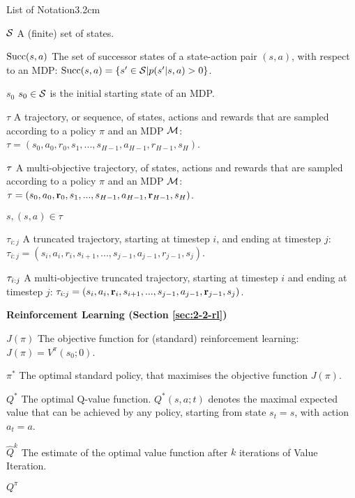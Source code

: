\begin{mclistof}{List of Notation}{3.2cm}
    \item[$\mathcal{S}$]
        A (finite) set of states.
    \item[${\textnormal{Succ}(s,a)}$]
        The set of successor states of a state-action pair $(s,a)$, with respect to an MDP: ${\textnormal{Succ}(s,a)}=\{s'\in\mathcal{S}|p(s'|s,a)>0\}$.
    \item[$s_0$]
        $s_0\in\mathcal{S}$ is the initial starting state of an MDP.
    \item[$\tau$]
        A trajectory, or sequence, of states, actions and rewards that are sampled according to a policy $\pi$ and an MDP $\mathcal{M}$: $\tau = (s_0, a_0, r_0, s_1, ..., s_{H-1}, a_{H-1}, r_{H-1}, s_H)$.
    \item[$\mathbf{\tau}$]
        A multi-objective trajectory, of states, actions and rewards that are sampled according to a policy $\pi$ and an MDP $\mathcal{M}$: $\mathbf{\tau} = (s_0, a_0, \mathbf{r}_0, s_1, ..., s_{H-1}, a_{H-1}, \mathbf{r}_{H-1}, s_H)$.
    \item[$s,(s,a)\in\tau$]  
    \item[$\tau_{i:j}$]
        A truncated trajectory, starting at timestep $i$, and ending at timestep $j$: $\tau_{i:j} = (s_i, a_i, r_i, s_{i+1}, ..., s_{j-1}, a_{j-1}, r_{j-1}, s_j)$. 
    \item[$\mathbf{\tau}_{i:j}$] 
        A multi-objective truncated trajectory, starting at timestep $i$ and ending at timestep $j$: $\mathbf{\tau}_{i:j} = (s_i, a_i, \mathbf{r}_i, s_{i+1}, ..., s_{j-1}, a_{j-1}, \mathbf{r}_{j-1}, s_j)$.
    \\
    \item[{\parbox[t]{\textwidth}{
            \Large\textbf{Reinforcement Learning (Section \ref{sec:2-2-rl})}\hfill\hfill
          }}]
    \item[$J(\pi)$] 
        The objective function for (standard) reinforcement learning: $J(\pi) = V^{\pi}(s_0;0)$.
    \item[$\pi^*$]
        The optimal standard policy, that maximises the objective function $J(\pi)$.
    \item[$Q^*$]
        The optimal Q-value function. $Q^*(s,a;t)$ denotes the maximal expected value that can be achieved by any policy, starting from state $s_t=s$, with action $a_t=a$.
    \item[$\hat{Q}^k$]
        The estimate of the optimal value function after $k$ iterations of Value Iteration. 
    \item[$Q^{\pi}$]

\end{mclistof}
